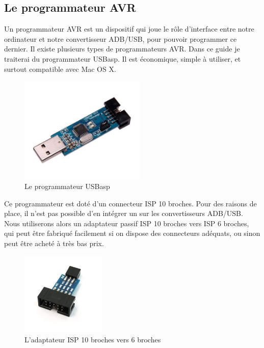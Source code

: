 \documentclass[12pt,a4paper,final]{article}
\begin{document}
\subsection{Le programmateur AVR}

Un programmateur AVR est un dispositif qui joue le rôle d'interface entre notre ordinateur et notre convertisseur ADB/USB, pour pouvoir programmer ce dernier. Il existe plusieurs types de programmateurs AVR. Dans ce guide je traiterai du programmateur USBasp. Il est économique, simple à utiliser, et surtout compatible avec Mac OS X.

\begin{figure}[h]
    \centering
    \includegraphics[width=6cm]{usbasp.jpg}
    \caption{Le programmateur USBasp}
    \label{fig:2}
\end{figure}

\FloatBarrier

Ce programmateur est doté d'un connecteur ISP 10 broches. Pour des raisons de place, il n'est pas possible d'en intégrer un sur les convertisseurs ADB/USB. Nous utiliserons alors un adaptateur passif ISP 10 broches vers ISP 6 broches, qui peut être fabriqué facilement si on dispose des connecteurs adéquats, ou sinon peut être acheté à très bas prix.

\begin{figure}[h]
    \centering
    \includegraphics[width=4cm]{isp_adapter.jpg}
    \caption{L'adaptateur ISP 10 broches vers 6 broches}
    \label{fig:3}
\end{figure}

\FloatBarrier
\end{document}
